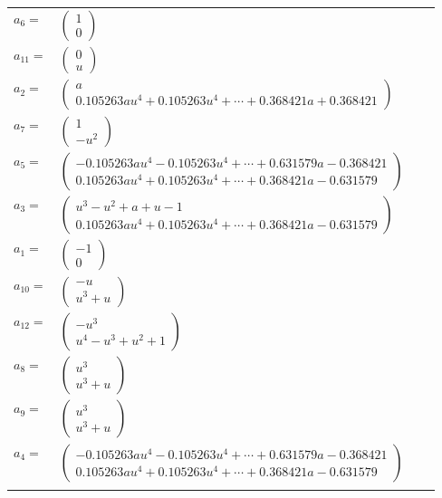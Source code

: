 \documentclass[1p]{elsarticle_modified}
\theoremstyle{definition}
\begin{document}
\begin{tabular}{m{7pt} m{180pt} m{7pt} m{180pt} }
\flushright $a_{6}=$&$\begin{pmatrix}1\\0\end{pmatrix}$ \\
\flushright $a_{11}=$&$\begin{pmatrix}0\\u\end{pmatrix}$ \\
\flushright $a_{2}=$&$\begin{pmatrix}a\\0.105263 a u^{4}+0.105263 u^{4}+\cdots+0.368421 a+0.368421\end{pmatrix}$ \\
\flushright $a_{7}=$&$\begin{pmatrix}1\\- u^2\end{pmatrix}$ \\
\flushright $a_{5}=$&$\begin{pmatrix}-0.105263 a u^{4}-0.105263 u^{4}+\cdots+0.631579 a-0.368421\\0.105263 a u^{4}+0.105263 u^{4}+\cdots+0.368421 a-0.631579\end{pmatrix}$ \\
\flushright $a_{3}=$&$\begin{pmatrix}u^3- u^2+a+u-1\\0.105263 a u^{4}+0.105263 u^{4}+\cdots+0.368421 a-0.631579\end{pmatrix}$ \\
\flushright $a_{1}=$&$\begin{pmatrix}-1\\0\end{pmatrix}$ \\
\flushright $a_{10}=$&$\begin{pmatrix}- u\\u^3+u\end{pmatrix}$ \\
\flushright $a_{12}=$&$\begin{pmatrix}- u^3\\u^4- u^3+u^2+1\end{pmatrix}$ \\
\flushright $a_{8}=$&$\begin{pmatrix}u^3\\u^3+u\end{pmatrix}$ \\
\flushright $a_{9}=$&$\begin{pmatrix}u^3\\u^3+u\end{pmatrix}$ \\
\flushright $a_{4}=$&$\begin{pmatrix}-0.105263 a u^{4}-0.105263 u^{4}+\cdots+0.631579 a-0.368421\\0.105263 a u^{4}+0.105263 u^{4}+\cdots+0.368421 a-0.631579\end{pmatrix}$\\&\end{tabular}
\end{document}
